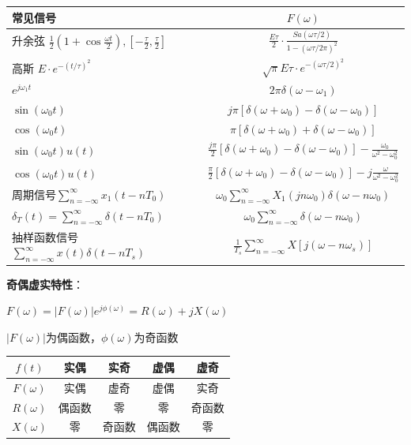 \begin{center}
\begin{tabularx}{\columnwidth}{|X|c|}
\hline
常见信号 & $F(\omega)$ \\
\hline
升余弦 $\frac{1}{2}(1+\cos\frac{\omega t}{2}), [-\frac{\tau}{2},\frac{\tau}{2}]$ & $\frac{E\tau}{2}\cdot\frac{Sa(\omega\tau/2)}{1-(\omega\tau/2\pi)^2}$ \\
\hline
高斯 $E\cdot e^{-(t/\tau)^2}$ & $\sqrt{\pi}E\tau\cdot e^{-(\omega\tau/2)^2}$ \\
\hline
$e^{j\omega _1 t}$ & $2\pi \delta(\omega-\omega_1)$ \\
\hline
$\sin(\omega_0 t)$ & $j\pi[\delta(\omega+\omega_0)-\delta(\omega-\omega_0)]$ \\
\hline
$\cos(\omega_0 t)$ & $\pi[\delta(\omega+\omega_0)+\delta(\omega-\omega_0)]$ \\
\hline
$\sin(\omega_0 t)u(t)$ & $\frac{j \pi}{2}\left[\delta\left(\omega+\omega_0\right)-\delta\left(\omega-\omega_0\right)\right]-\frac{\omega_0}{\omega^2-\omega_0^2}$ \\
\hline
$\cos(\omega_0 t)u(t)$ & $\frac{\pi}{2}\left[\delta\left(\omega+\omega_0\right)-\delta\left(\omega-\omega_0\right)\right]-j \frac{\omega}{\omega^2-\omega_0^2}$ \\
\hline
周期信号$\sum_{n=-\infty}^{\infty} x_1\left(t-n T_0\right)$ & $\omega_0 \sum_{n=-\infty}^{\infty} X_1\left(j n \omega_0\right) \delta\left(\omega-n \omega_0\right)$ \\
\hline
$\delta_T(t)=\sum_{n=-\infty}^{\infty} \delta\left(t-n T_0\right)$ & $\omega_0 \sum_{n=-\infty}^{\infty} \delta\left(\omega-n \omega_0\right)$ \\
\hline
抽样函数信号$\sum_{n=-\infty}^{\infty} x(t) \delta\left(t-n T_s\right)$ & $\frac{1}{T_s} \sum_{n=-\infty}^{\infty} X\left[j\left(\omega-n \omega_s\right)\right]$ \\
\hline
\end{tabularx}
\end{center}

\textbf{奇偶虚实特性}：

$F(\omega)=|F(\omega)|e^{j\phi(\omega)}=R(\omega)+jX(\omega)$

$|F(\omega)|$为偶函数，$\phi(\omega)$为奇函数
\begin{center}
	\begin{tabular}{|c|c|c|c|c|}
		\hline
		$f(t)$ & 实偶 & 实奇 & 虚偶 & 虚奇 \\
		\hline
		$F(\omega)$ & 实偶 & 虚奇 & 虚偶 & 实奇 \\
		\hline
		$R(\omega)$ & 偶函数 & 零 & 零 & 奇函数 \\
		\hline
		$X(\omega)$ & 零 & 奇函数 & 偶函数 & 零 \\
		\hline
	\end{tabular}
\end{center}

